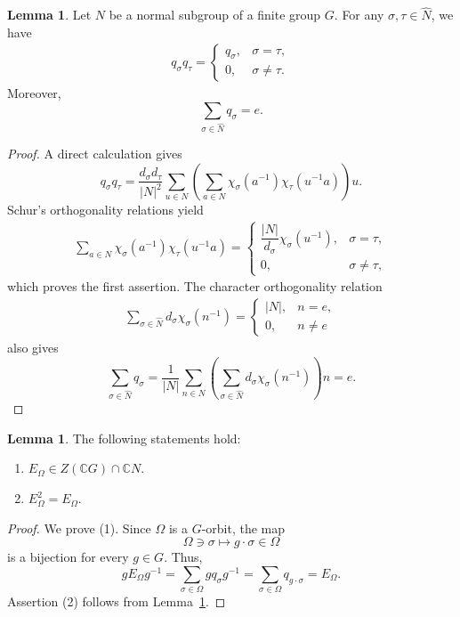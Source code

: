\documentclass[12pt,a4paper]{article}
\theoremstyle{definition}
\newtheorem{lem}[definition]{Lemma}
\numberwithin{definition}{section}
\begin{document}
\begin{lem}\label{lem:2.16}
Let $N$ be a normal subgroup of a finite group $G$.
For any $\sigma, \tau \in \widehat{N}$, we have
\begin{align*}
q_{\sigma} q_{\tau} =
\begin{cases}
q_{\sigma}, & \sigma = \tau, \\
0, & \sigma \neq \tau.
\end{cases}
\end{align*}
Moreover,
\[
\sum_{\sigma \in \widehat{N}} q_{\sigma} = e.
\]
\end{lem}
\begin{proof}
A direct calculation gives
\[
q_{\sigma} q_{\tau} = \frac{d_{\sigma} d_{\tau}}{|N|^{2}} \sum_{u \in N} \left( \sum_{a \in N} \chi_{\sigma}(a^{-1}) \chi_{\tau}(u^{-1} a) \right) u.
\]
Schur's orthogonality relations yield
\begin{align*}
\sum_{a \in N} \chi_{\sigma}(a^{-1}) \chi_{\tau}(u^{-1} a) =
\begin{cases}
\dfrac{|N|}{d_{\sigma}} \chi_{\sigma}(u^{-1}), & \sigma = \tau, \\
0, & \sigma \neq \tau,
\end{cases}
\end{align*}
which proves the first assertion.
The character orthogonality relation
\begin{align*}
\sum_{\sigma \in \widehat{N}} d_{\sigma} \chi_{\sigma}(n^{-1})
=
\begin{cases}
|N|, & n = e, \\
0, & n \neq e
\end{cases}
\end{align*}
also gives
\[
\sum_{\sigma \in \widehat{N}} q_{\sigma}
= \frac{1}{|N|} \sum_{n \in N} \left( \sum_{\sigma \in \widehat{N}} d_{\sigma} \chi_{\sigma}(n^{-1}) \right) n
= e.
\]
\end{proof}

\begin{lem}\label{lem:2.17}
The following statements hold:
\begin{enumerate}
\item[(1)] $E_{\Omega} \in Z(\mathbb{C}G) \cap \mathbb{C}N$.
\item[(2)] $E_{\Omega}^{2} = E_{\Omega}$.
\end{enumerate}
\end{lem}
\begin{proof}
We prove (1).
Since $\Omega$ is a $G$-orbit, the map
\[
\Omega \ni \sigma \mapsto g \cdot \sigma \in \Omega
\]
is a bijection for every $g \in G$.
Thus,
\[
g E_{\Omega} g^{-1} = \sum_{\sigma \in \Omega} g q_{\sigma} g^{-1} = \sum_{\sigma \in \Omega} q_{g \cdot \sigma} = E_{\Omega}.
\]
Assertion (2) follows from Lemma~\ref{lem:2.16}.
\end{proof}
\end{document}

